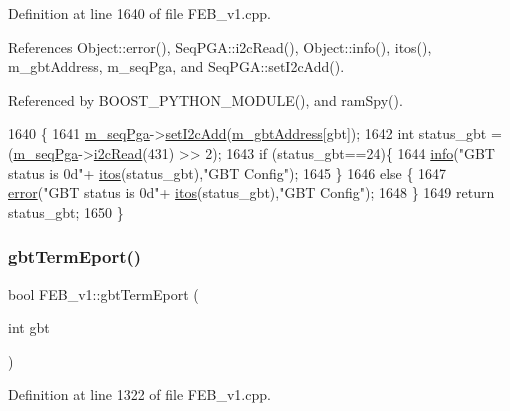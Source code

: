 Definition at line 1640 of file F\+E\+B\+\_\+v1.\+cpp.



References Object\+::error(), Seq\+P\+G\+A\+::i2c\+Read(), Object\+::info(), itos(), m\+\_\+gbt\+Address, m\+\_\+seq\+Pga, and Seq\+P\+G\+A\+::set\+I2c\+Add().



Referenced by B\+O\+O\+S\+T\+\_\+\+P\+Y\+T\+H\+O\+N\+\_\+\+M\+O\+D\+U\+L\+E(), and ram\+Spy().


\begin{DoxyCode}
1640                             \{
1641   \hyperlink{classFEB__v1_a6c7804ac86796f233a8393043adf2e77}{m\_seqPga}->\hyperlink{classSeqPGA_a4ef334e4d2cb417b49033dce951728cd}{setI2cAdd}(\hyperlink{classFEB__v1_ac625855df976f16694178f1a4c0eef1e}{m\_gbtAddress}[gbt]);
1642   \textcolor{keywordtype}{int} status\_gbt = (\hyperlink{classFEB__v1_a6c7804ac86796f233a8393043adf2e77}{m\_seqPga}->\hyperlink{classSeqPGA_a7cd344df2be99f3a02b487f80e87b27e}{i2cRead}(431) >> 2);
1643   \textcolor{keywordflow}{if} (status\_gbt==24)\{
1644     \hyperlink{classObject_a644fd329ea4cb85f54fa6846484b84a8}{info}(\textcolor{stringliteral}{"GBT status is 0d"}+ \hyperlink{Tools_8h_af330027dbdafb9a30768b3613c553e60}{itos}(status\_gbt),\textcolor{stringliteral}{"GBT Config"});
1645   \}
1646   \textcolor{keywordflow}{else} \{
1647     \hyperlink{classObject_a204a95f57818c0f811933917a30eff45}{error}(\textcolor{stringliteral}{"GBT status is 0d"}+ \hyperlink{Tools_8h_af330027dbdafb9a30768b3613c553e60}{itos}(status\_gbt),\textcolor{stringliteral}{"GBT Config"});
1648   \}
1649   \textcolor{keywordflow}{return} status\_gbt;
1650 \}
\end{DoxyCode}
\mbox{\label{classFEB__v1_a84fa302a012eee663fe21829866fb20e}} 
\subsubsection{\texorpdfstring{gbt\+Term\+Eport()}{gbtTermEport()}}
{\footnotesize\ttfamily bool F\+E\+B\+\_\+v1\+::gbt\+Term\+Eport (\begin{DoxyParamCaption}\item[{int}]{gbt }\end{DoxyParamCaption})}



Definition at line 1322 of file F\+E\+B\+\_\+v1.\+cpp.



